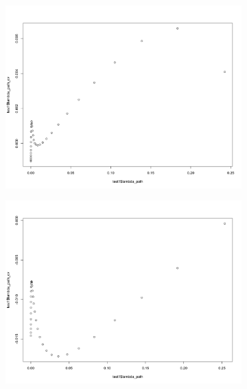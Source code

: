 \documentclass[letterpaper]{article}
\begin{document}
\begin{figure}[H]
\centering
\begin{subfigure}{0.5\textwidth}
  \centering
  \includegraphics[width=1\linewidth]{./result_plot/fix_k/3wrong_path_plot}
\end{subfigure}%
\begin{subfigure}{.5\textwidth}
  \centering
  \includegraphics[width=1\linewidth]{./result_plot/fix_k/4wrong_path_plot}
\end{subfigure}

\end{figure}
\end{document}
